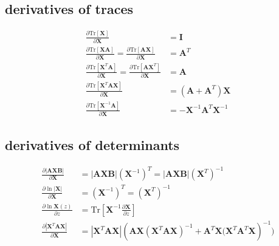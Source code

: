 \documentclass[11pt]{article}
\newcommand{\mat}[1]{\mathbf{#1}}
\renewcommand{\t}{T}
\newcommand{\inv}{{-1}}
\numberwithin{equation}{subsection}
\begin{document}
\subsection{derivatives of traces}
\begin{align}
\frac{
	\partial \mathrm{Tr}[\mat{X}]
}{
	\partial \mat{X}
} & = \mat{I} \\
\frac{
	\partial \mathrm{Tr}[\mat{XA}]
}{
	\partial \mat{X}
} = 
\frac{
	\partial \mathrm{Tr}[\mat{AX}]
}{
	\partial \mat{X}
} & = \mat{A}^\t \\
\frac{
	\partial \mathrm{Tr}[\mat{X}^\t\mat{A}]
}{
	\partial \mat{X}
} = 
\frac{
	\partial \mathrm{Tr}[\mat{AX}^\t]
}{
	\partial \mat{X}
} & = \mat{A} \\
\frac{
	\partial \mathrm{Tr}[\mat{X}^\t \mat{A} \mat{X} ]
}{
	\partial \mat{X}
} & = (\mat{A} + \mat{A}^\t)\mat{X} \\
\frac{
	\partial \mathrm{Tr}[\mat{X}^\inv \mat{A}]
}{
	\partial \mat{X}
} & = -\mat{X}^\inv \mat{A}^\t \mat{X}^\inv
\end{align}
\subsection{derivatives of determinants}
\begin{align}
\frac{
	\partial |\mat{AXB}|
}{
	\partial \mat{X}
} & =
|\mat{AXB}|(\mat{X}^\inv)^\t = 
|\mat{AXB}|(\mat{X}^\t)^\inv \\
\frac{
	\partial \ln |\mat{X}|
}{
	\partial \mat{X}
} & =
(\mat{X}^\inv)^\t = (\mat{X}^\t)^\inv \\
%
\frac{
	\partial \ln \mat{X}(z)
}{
	\partial z
} & = \mathrm{Tr}
\left[
		\mat{X}^\inv \frac{\partial \mat{X}}{\partial z}
\right] \\
%
\frac{
	\partial |\mat{X}^\t \mat{A} \mat{X}|
	}{
	\partial \mat{X}
	} & = 
	|\mat{X}^\t \mat{AX}| 
	\left(
		\mat{AX} (\mat{X}^\t \mat{AX})^\inv +
	\mat{A}^\t \mat{X} (\mat{X}^\t \mat{A}^\t \mat{X}
	\right)^\inv)
\end{align}
\end{document}
